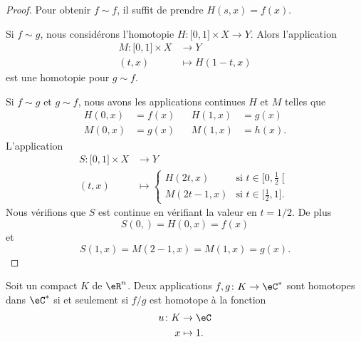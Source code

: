 \begin{proof}
    Pour obtenir \( f\sim f\), il suffit de prendre \( H(s,x)=f(x)\).

    Si \( f\sim g\), nous considérons l'homotopie \( H\colon \mathopen[ 0 , 1 \mathclose]\times X\to Y\). Alors l'application
    \begin{equation}
        \begin{aligned}
            M\colon \mathopen[ 0 , 1 \mathclose]\times X&\to Y \\
            (t,x)&\mapsto H(1-t,x) 
        \end{aligned}
    \end{equation}
    est une homotopie pour \( g\sim f\).

    Si \( f\sim g\) et \( g\sim f\), nous avons les applications continues \( H\) et \( M\) telles que
    \begin{subequations}
        \begin{align}
        H(0,x)&=f(x)&&H(1,x)&=g(x)\\
        M(0,x)&=g(x)&&M(1,x)&=h(x).
        \end{align}
    \end{subequations}
    L'application
    \begin{equation}
        \begin{aligned}
            S\colon \mathopen[ 0 , 1 \mathclose]\times X&\to Y \\
            (t,x)&\mapsto \begin{cases}
                H(2t,x)    &   \text{si } t\in\mathopen[ 0 , \frac{ 1 }{2} \mathclose[\\
                M(2t-1,x)    &    \text{si }t\in\mathopen[ \frac{ 1 }{2} , 1 \mathclose].
            \end{cases}
        \end{aligned}
    \end{equation}
    Nous vérifions que \( S\) est continue en vérifiant la valeur en \( t=1/2\). De plus 
    \begin{equation}
        S(0,)=H(0,x)=f(x)
    \end{equation}
    et
    \begin{equation}
        S(1,x)=M(2-1,x)=M(1,x)=g(x).
    \end{equation}
\end{proof}


\begin{proposition}
    Soit un compact \( K\) de \( \eR^n\). Deux applications \( f,g\colon K\to \eC^*\) sont homotopes dans \( \eC^*\) si et seulement si \( f/g\) est homotope à la fonction 
    \begin{equation}
        \begin{aligned}
            u\colon K&\to \eC \\
            x&\mapsto 1. 
        \end{aligned}
    \end{equation}
\end{proposition}

